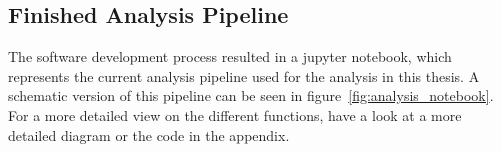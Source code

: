 \subsection{Finished Analysis Pipeline}
The software development process resulted in a jupyter notebook, which represents the current analysis pipeline used for the analysis in this thesis. A schematic version of this pipeline can be seen in figure~\ref{fig:analysis_notebook}. For a more detailed view on the different functions, have a look at a more detailed diagram or the code in the appendix. 

